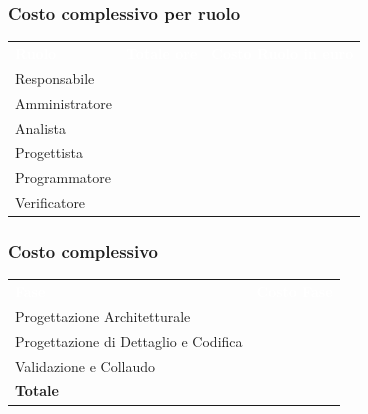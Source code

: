 \subsubsection{Costo complessivo per ruolo}
{
	\renewcommand{\arraystretch}{2}
	\centering
	\begin{longtable}{ C{3cm} C{2cm} C{4cm}}
		\textcolor{white}{\textbf{Ruolo}} & \textcolor{white}{\textbf{Totale ore}} & \textcolor{white}{\textbf{Costo Ruolo in euro}}\\	
        
        Responsabile & & \\
        Amministratore & & \\
        Analista & & \\
         Progettista & & \\
        Programmatore & & \\
        Verificatore & & \\
		
	\end{longtable}
}

\subsubsection{Costo complessivo}
{
	\renewcommand{\arraystretch}{2}
	\centering
	\begin{longtable}{ C{5cm} C{5cm}}
		\textcolor{white}{\textbf{Fase}} & \textcolor{white}{\textbf{Costo Fase}}\\	
		
		Progettazione Architetturale &  \\
		Progettazione di Dettaglio e Codifica & \\
		Validazione e Collaudo & \\
		\textbf{Totale} & \\
		
	\end{longtable}
}




